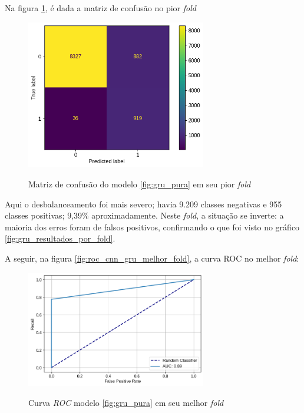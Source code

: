 Na figura \ref{fig:matriz_confusao_pior_fold_gru}, é dada a matriz de confusão no pior \textit{fold}

\begin{figure}[H]
  \centering
  \caption{Matriz de confusão do modelo \ref{fig:gru_pura} em seu pior \textit{fold}}
   \includegraphics[width=0.7\textwidth]{figuras/modelos_resultados/gru/matriz_confusao_pior_fold_gru_alt.png} %
  \label{fig:matriz_confusao_pior_fold_gru}
\end{figure}

Aqui o desbalanceamento foi mais severo; havia 9.209 classes negativas e 955 classes positivas; 9,39\% aproximadamente. 
Neste \textit{fold}, a situação se inverte: a maioria dos erros foram de falsos positivos, confirmando o que foi visto no 
gráfico \ref{fig:gru_resultados_por_fold}.


A seguir, na figura \ref{fig:roc_cnn_gru_melhor_fold}, a curva ROC no melhor \textit{fold}:

\begin{figure}[H]
  \centering
  \caption{Curva \textit{ROC} modelo \ref{fig:gru_pura} em seu melhor \textit{fold}}
   \includegraphics[width=0.7\textwidth]{figuras/modelos_resultados/gru/roc_gru_melhor_fold.png} %
  \label{fig:roc_melhor_fold_gru}
\end{figure}

